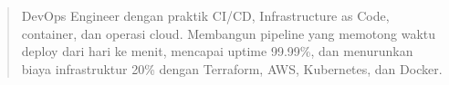 \begin{quote}
DevOps Engineer dengan praktik CI/CD, Infrastructure as Code, container, dan operasi cloud. Membangun pipeline yang memotong waktu deploy dari hari ke menit, mencapai uptime 99.99\%, dan menurunkan biaya infrastruktur 20\% dengan Terraform, AWS, Kubernetes, dan Docker.
\end{quote}
\divider
{}

\par{}
  \\
  \\
  
\divider\smallskip
{}  \\
  
\par
